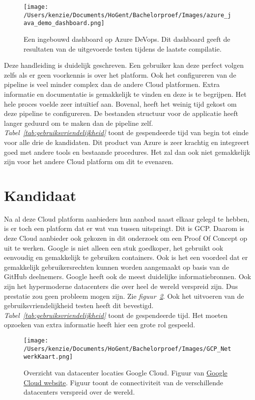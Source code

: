 \begin{figure}[!htbp]
    \centering
    \texttt{[image: /Users/kenzie/Documents/HoGent/Bachelorproef/Images/azure\_java\_demo\_dashboard.png]}
    \caption{Een ingebouwd dashboard op Azure DeVops. Dit dashboard geeft de resultaten van de uitgevoerde testen tijdens de laatste compilatie.}
    \label{fig:azure_java_demo_dashboard}
\end{figure}

Deze handleiding is duidelijk geschreven. Een gebruiker kan deze perfect volgen zelfs als er geen voorkennis is over het platform. Ook het configureren van de pipeline is veel minder complex dan de andere Cloud platformen. Extra informatie en documentatie is gemakkelijk te vinden en deze is te begrijpen. Het hele proces voelde zeer intuïtief aan. Bovenal, heeft het weinig tijd gekost om deze pipeline te configureren. De bestanden structuur voor de applicatie heeft langer geduurd om te maken dan de pipeline zelf. \emph{Tabel~\ref{tab:gebruiksvriendelijkheid}} toont de gespendeerde tijd van begin tot einde voor alle drie de kandidaten. Dit product van Azure is zeer krachtig en integreert goed met andere tools en bestaande procedures. Het zal dan ook niet gemakkelijk zijn voor het andere Cloud platform om dit te evenaren.

\section{Kandidaat}
\label{sec:kandidaat}
Na al deze Cloud platform aanbieders hun aanbod naast elkaar gelegd te hebben, is er toch een platform dat er wat van tussen uitspringt. Dit is GCP. Daarom is deze Cloud aanbieder ook gekozen in dit onderzoek om een Proof Of Concept op uit te werken. Google is niet alleen een stuk goedkoper, het gebruikt ook eenvoudig en gemakkelijk te gebruiken containers. Ook is het een voordeel dat er gemakkelijk gebruikersrechten kunnen worden aangemaakt op basis van de GitHub deelnemers. Google heeft ook de meest duidelijke informatiebronnen. Ook zijn het hypermoderne datacenters die over heel de wereld verspreid zijn. Dus prestatie zou geen probleem mogen zijn. Zie \emph{figuur~\ref{fig:GCP_NetwerkKaart}}. Ook het uitvoeren van de gebruiksvriendelijkheid testen heeft dit bevestigd. \emph{Tabel~\ref{tab:gebruiksvriendelijkheid}} toont de gespendeerde tijd. Het moeten opzoeken van extra informatie heeft hier een grote rol gespeeld.

\begin{figure}[!htbp]
    \centering
    \texttt{[image: /Users/kenzie/Documents/HoGent/Bachelorproef/Images/GCP\_NetwerkKaart.png]}
    \caption{Overzicht van datacenter locaties Google Cloud. Figuur van \href{}{Google Cloud website}. Figuur toont de connectiviteit van de verschillende datacenters verspreid over de wereld.}
    \label{fig:GCP_NetwerkKaart}
\end{figure}

